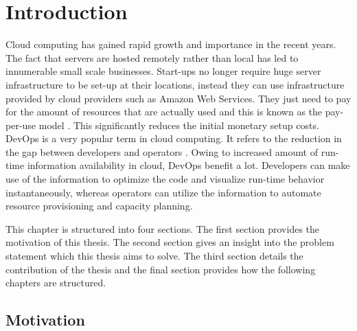 \documentclass[article,type=msc,colorback,12pt,accentcolor=tud8b,table]{tudthesis}
\begin{document}
\clearpage

\setlength{ \parskip }{1em}
\tableofcontents 
\cleardoublepage 
\listoffigures
\cleardoublepage 
\listoftables
\clearpage
\cleardoublepage 


\hfill
 \section{Introduction}
	 \hfill \break
	
		Cloud computing has gained rapid growth and importance in the recent years. The fact that servers are hosted remotely rather than local has led to innumerable small scale businesses. Start-ups no longer require huge server infrastructure to be set-up at their locations, instead they can use infrastructure provided by cloud providers such as Amazon Web Services\cite{aws}. They just need to pay for the amount of resources that are actually used and this is known as the pay-per-use model \cite{armbrust2010view}. This significantly reduces the initial monetary setup costs. DevOps is a very popular term in cloud computing. It refers to the reduction in the gap between developers and operators \cite{httermann2012devops} . Owing to increased amount of run-time information availability in cloud, DevOps benefit a lot. Developers can make use of the information to optimize the code and visualize run-time behavior instantaneously, whereas operators can utilize the information to automate resource provisioning and capacity planning.
		
		
		\par This chapter is structured into four sections. The first section provides the motivation of this thesis. The second section gives an insight into the problem statement which this thesis aims to solve. The third section details the contribution of the thesis and the final section provides how the following chapters are structured.
	
	
	\subsection{Motivation}
	
\end{document}
